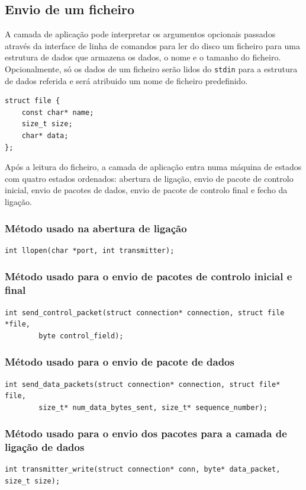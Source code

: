 \documentclass[a4paper,11pt,titlepage]{article}
\begin{document}
\subsection{Envio de um ficheiro}
A camada de aplicação pode interpretar os argumentos opcionais passados através da interface de linha de comandos para ler do disco um ficheiro para uma estrutura de dados que armazena os dados, o nome e o tamanho do ficheiro. Opcionalmente, só os dados de um ficheiro serão lidos do \texttt{stdin} para a estrutura de dados referida e será atribuido um nome de ficheiro predefinido.

\begin{verbatim}
struct file {
    const char* name;
    size_t size;
    char* data;
};
\end{verbatim}

Após a leitura do ficheiro, a camada de aplicação entra numa máquina de estados com quatro estados ordenados: abertura de ligação, envio de pacote de controlo inicial, envio de pacotes de dados, envio de pacote de controlo final e fecho da ligação.

\subsubsection*{Método usado na abertura de ligação}

\begin{verbatim}
int llopen(char *port, int transmitter);
\end{verbatim}

\subsubsection*{Método usado para o envio de pacotes de controlo inicial e final}
\begin{verbatim}
int send_control_packet(struct connection* connection, struct file *file,
        byte control_field);
\end{verbatim}

\subsubsection*{Método usado para o envio de pacote de dados}
\begin{verbatim}
int send_data_packets(struct connection* connection, struct file* file,
        size_t* num_data_bytes_sent, size_t* sequence_number);
\end{verbatim}

\subsubsection*{Método usado para o envio dos pacotes para a camada de ligação de dados}
\begin{verbatim}
int transmitter_write(struct connection* conn, byte* data_packet, size_t size);
\end{verbatim}
\end{document}

